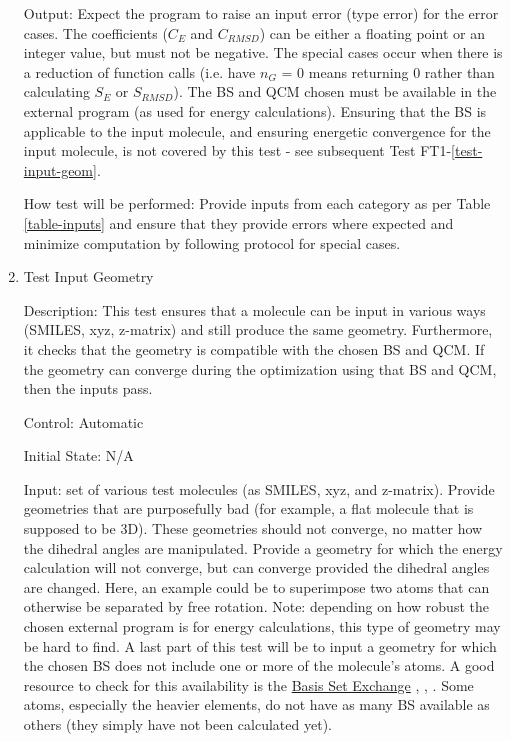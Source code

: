\documentclass[12pt, titlepage]{article}
\begin{document}
\begin{enumerate}
Output: Expect the program to raise an input error (type error) for the error 
cases. The coefficients ($C_E$ and $C_{RMSD}$) can be either a floating point 
or an integer value, but must not be negative. The special cases occur when 
there is a reduction of function calls (i.e. have $n_G$ = 0 means returning 0 
rather than calculating $S_E$ or $S_{RMSD}$). The BS and QCM chosen must be 
available in the external program (as used for energy calculations). Ensuring 
that the BS is applicable to the input molecule, and ensuring energetic 
convergence for the input molecule, is not covered by this test - see 
subsequent Test FT1-\ref{test-input-geom}.


How test will be performed: Provide inputs from each category as per Table 
\ref{table-inputs} and ensure that they provide errors where expected and 
minimize computation by following protocol for special cases.

\item Test Input Geometry \label{test-input-geom}

Description: This test ensures that a molecule can be input in various ways 
(SMILES, xyz, z-matrix) and still produce the same geometry. Furthermore, it 
checks that the geometry is compatible with the chosen BS and QCM. If the 
geometry can converge during the optimization using that BS and QCM, then the 
inputs pass.

Control: Automatic

Initial State: N/A

Input: set of various test molecules (as SMILES, xyz, and z-matrix). Provide 
geometries that are purposefully bad (for example, a flat molecule that is 
supposed to be 3D). These geometries should not converge, no matter how the 
dihedral angles are manipulated. Provide a geometry for which the energy 
calculation will not converge, but can converge provided the dihedral angles 
are changed. Here, an example could be to superimpose two atoms that can 
otherwise be separated by free rotation. Note: depending on how robust the 
chosen external program is for energy calculations, this type of geometry may 
be hard to find. A last part of this test will be to input a geometry for which 
the chosen BS does not include one or more of the molecule's atoms. A 
good resource to check for this availability is the 
\href{https://bse.pnl.gov/bse/portal}{Basis Set Exchange}  
\cite{basis-set-exchange-ref1}, \cite{basis-set-exchange-ref2}, 
\cite{basis-set-exchange-web}.
 Some atoms, 
especially the heavier elements, do not have as many BS available as others 
(they simply have not been calculated yet).  


\end{enumerate}
\end{document}
